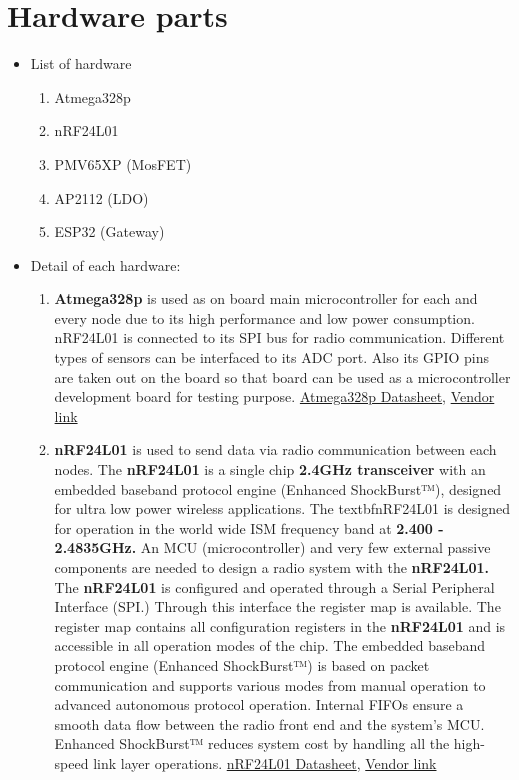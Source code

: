 \documentclass[a4paper,12pt,oneside]{book}
\begin{document}
\section{Hardware parts}
\begin{itemize}
  \item List of hardware 
  \begin{enumerate}
  \item Atmega328p
  \item nRF24L01
  \item PMV65XP (MosFET)
  \item AP2112 (LDO)
  \item ESP32 (Gateway)
  \end{enumerate}
  \clearpage
  \item Detail of each hardware: 
       \begin{enumerate}
        \item \textbf{Atmega328p} is used as on board main microcontroller for each and every node due to its high performance and low power consumption. nRF24L01 is connected to its SPI bus for radio communication. Different types of sensors can be interfaced to its ADC port. Also its GPIO pins are taken out on the board so that board can be used as a microcontroller development board for testing purpose.
\href{http://ww1.microchip.com/downloads/en/DeviceDoc/Atmel-42735-8-bit-AVR-Microcontroller-ATmega328-328P_Datasheet.pdf}{Atmega328p Datasheet},
        \href{https://www.amazon.in/Microcontroller-Atmega328P-Au-Tqfp-32-Atmel-Chip/dp/B004ZV92TA?tag=googinhydr18418-21&tag=googinkenshoo-21&ascsubtag=038287ef-bfda-4a20-8b15-785c3e8b240c}{Vendor link}
        \item \textbf{nRF24L01} is used to send data via radio communication between each nodes. The \textbf{nRF24L01} is a single chip \textbf{2.4GHz transceiver} with an embedded baseband protocol engine
(Enhanced ShockBurst™), designed for ultra low power wireless applications. The textbf{nRF24L01} is designed
for operation in the world wide ISM frequency band at \textbf{2.400 - 2.4835GHz.} An MCU (microcontroller) and
very few external passive components are needed to design a radio system with the \textbf{nRF24L01.}
The \textbf{nRF24L01} is configured and operated through a Serial Peripheral Interface (SPI.) Through this interface
the register map is available. The register map contains all configuration registers in the \textbf{nRF24L01}
and is accessible in all operation modes of the chip.
The embedded baseband protocol engine (Enhanced ShockBurst™) is based on packet communication
and supports various modes from manual operation to advanced autonomous protocol operation. Internal
FIFOs ensure a smooth data flow between the radio front end and the system’s MCU. Enhanced ShockBurst™
reduces system cost by handling all the high-speed link layer operations.
         \href{https://www.nordicsemi.com/eng/content/download/2730/34105/file/nRF24L01_Product_Specification_v2_0.pdf}{nRF24L01 Datasheet},
  \href{https://robu.in/product/m177-nrf24l01-2-4ghz-antenna-wireless-transceiver-module/?gclid=Cj0KCQjwvezZBRDkARIsADKQyPknzJJk923OEc9ihJ7ZoGdwvh2pjVOp52CF125ixwnoAMcel50iYmwaAuKoEALw_wcB}{Vendor link}     


\end{enumerate}
\end{itemize}
\end{document}
